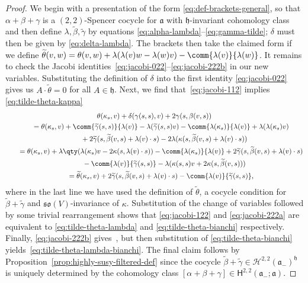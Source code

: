\documentclass[10pt,a4paper]{amsart}
\numberwithin{equation}{section}
\newcommand{\fa}{\mathfrak{a}}
\newcommand{\fh}{\mathfrak{h}}
\newcommand{\fso}{\mathfrak{so}}
\newcommand{\cH}{\mathcal{H}}
\newcommand{\ssH}{\mathsf{H}}
\newcommand{\betatilde}{\widetilde{\beta}}
\newcommand{\gammatilde}{\widetilde{\gamma}}
\newcommand{\thetatilde}{\widetilde{\theta}}
\newcommand{\1}{\mathbbm{1}}
\begin{document}
\begin{proof}
	We begin with a presentation of the form \eqref{eq:def-brackets-general}, so that $\alpha+\beta+\gamma$ is a $(2,2)$-Spencer cocycle for $\fa$ with $\fh$-invariant cohomology class and then define $\lambda,\betatilde,\gammatilde$ by equations \eqref{eq:alpha-lambda}--\eqref{eq:gamma-tilde}; $\delta$ must then be given by \eqref{eq:delta-lambda}. The brackets then take the claimed form if we define
$\thetatilde(v,w) = \theta(v,w) + \lambda(\lambda(v)w-\lambda(w)v) - \comm{\lambda(v)}{\lambda(w)}$.
	It remains to check the Jacobi identities~\eqref{eq:jacobi-022}--\eqref{eq:jacobi-222b} in our new variables. Substituting the definition of $\delta$ into the first identity \eqref{eq:jacobi-022} gives us $A\cdot \thetatilde=0$ for all $A\in\fh$. Next, we find that~\eqref{eq:jacobi-112} implies \eqref{eq:tilde-theta-kappa}
	\begin{gather*}
		\theta(\kappa_s,v) + \delta(\gamma(s,s),v) + 2\gamma(s,\beta(v,s)) \\
		\qquad= \theta(\kappa_s,v) + \comm{\gammatilde(s,s)}{\lambda(v)} - \lambda(\gammatilde(s,s)v) - \comm{\lambda(\kappa_s)}{\lambda(v)} + \lambda(\lambda(\kappa_s)v) \\
		\phantom{\qquad=}{}+ 2\gammatilde(s,\betatilde(v,s)+\lambda(v)\cdot s) - 2\lambda(\kappa(s,\betatilde(v,s)+\lambda(v)\cdot s)) \\
	\qquad	= \theta(\kappa_s,v) + \lambda\qty(\lambda(\kappa_s)v - 2\kappa(s,\lambda(v)\cdot s)) - \comm{\lambda(\kappa_s)}{\lambda(v)} + 2\gammatilde(s,\betatilde(v,s)+\lambda(v)\cdot s)\\
			\phantom{\qquad=}{}- \comm{\lambda(v)}{\gammatilde(s,s)}
			- \lambda(\kappa(s,s)v + 2\kappa(s,\betatilde(v,s)))\\
		\qquad= \thetatilde(\kappa_s,v) + 2\gammatilde(s,\betatilde(v,s)+\lambda(v)\cdot s) - \comm{\lambda(v)}{\gammatilde(s,s)},
	\end{gather*}
	where in the last line we have used the definition of $\thetatilde$, a cocycle condition for $\betatilde+\gammatilde$ and $\fso(V)$-invariance of $\kappa$. Substitution of the change of variables followed by some trivial rearrangement shows that \eqref{eq:jacobi-122} and \eqref{eq:jacobi-222a} are equivalent to \eqref{eq:tilde-theta-lambda} and \eqref{eq:tilde-theta-bianchi} respectively. Finally, \eqref{eq:jacobi-222b} gives~\smash{$\bigl(\lambda(u)\cdot\thetatilde\bigr)(v,w)
			+ \lambda\bigl(\thetatilde(u,v)w\bigr)
	+ \text{cyclic perms.}= 0$},
	but then substitution of \eqref{eq:tilde-theta-bianchi} yields~\eqref{eq:tilde-theta-lambda-bianchi}. The final claim follows by Proposition~\ref{prop:highly-susy-filtered-def} since the cocycle $\betatilde+\gammatilde\in\cH^{2,2}(\fa_-)^\fh$ is uniquely determined by the cohomology class $[\alpha+\beta+\gamma]\in\ssH^{2,2}(\fa_-;\fa)$.
\end{proof}
\end{document}
